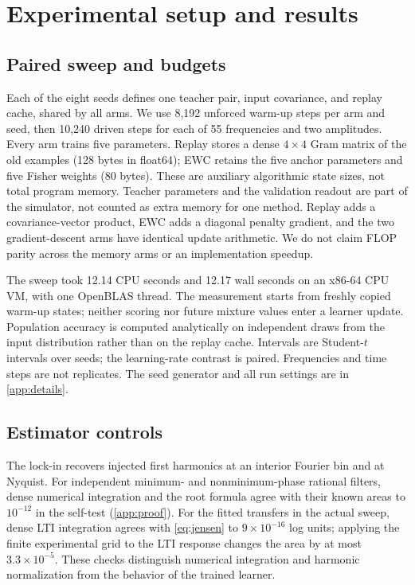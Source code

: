 \section{Experimental setup and results}
\label{sec:results}

\subsection{Paired sweep and budgets}

Each of the eight seeds defines one teacher pair, input covariance, and replay cache, shared by all arms. We use 8,192 unforced warm-up steps per arm and seed, then 10,240 driven steps for each of 55 frequencies and two amplitudes. Every arm trains five parameters. Replay stores a dense \(4\times4\) Gram matrix of the old examples (128 bytes in float64); EWC retains the five anchor parameters and five Fisher weights (80 bytes). These are auxiliary algorithmic state sizes, not total program memory. Teacher parameters and the validation readout are part of the simulator, not counted as extra memory for one method. Replay adds a covariance-vector product, EWC adds a diagonal penalty gradient, and the two gradient-descent arms have identical update arithmetic. We do not claim FLOP parity across the memory arms or an implementation speedup.

The sweep took 12.14 CPU seconds and 12.17 wall seconds on an x86-64 CPU VM, with one OpenBLAS thread. The measurement starts from freshly copied warm-up states; neither scoring nor future mixture values enter a learner update. Population accuracy is computed analytically on independent draws from the input distribution rather than on the replay cache. Intervals are Student-\(t\) intervals over seeds; the learning-rate contrast is paired. Frequencies and time steps are not replicates. The seed generator and all run settings are in \cref{app:details}.

\subsection{Estimator controls}
\label{sec:calibration}

The lock-in recovers injected first harmonics at an interior Fourier bin and at Nyquist. For independent minimum- and nonminimum-phase rational filters, dense numerical integration and the root formula agree with their known areas to \(10^{-12}\) in the self-test (\cref{app:proof}). For the fitted transfers in the actual sweep, dense LTI integration agrees with \cref{eq:jensen} to \(9\times 10^{-16}\) log units; applying the finite experimental grid to the LTI response changes the area by at most \(3.3\times10^{-5}\). These checks distinguish numerical integration and harmonic normalization from the behavior of the trained learner.

